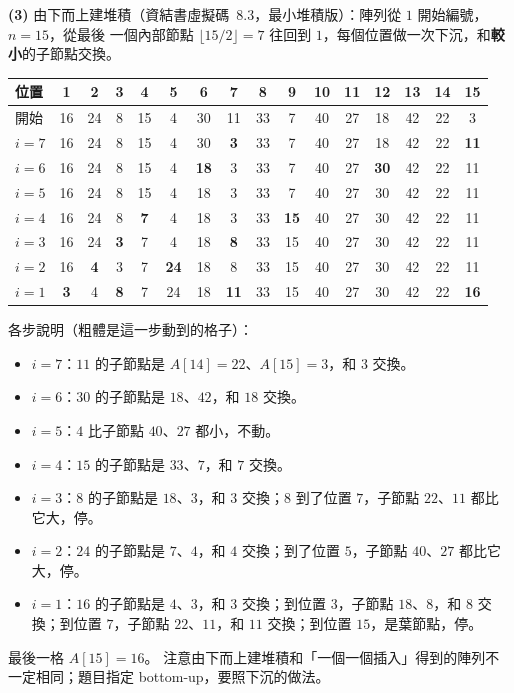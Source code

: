 \begin{pastsoln}
\textbf{(3)} 由下而上建堆積（資結書虛擬碼~8.3，最小堆積版）：陣列從 $1$ 開始編號，$n = 15$，從最後
一個內部節點 $\lfloor 15/2 \rfloor = 7$ 往回到 $1$，每個位置做一次下沉，和\textbf{較小}的子節點交換。
\begin{center}
\small
\setlength{\tabcolsep}{3.5pt}
\begin{tabular}{l*{15}{c}}
\toprule
位置 & 1 & 2 & 3 & 4 & 5 & 6 & 7 & 8 & 9 & 10 & 11 & 12 & 13 & 14 & 15 \\
\midrule
開始 & 16 & 24 & 8 & 15 & 4 & 30 & 11 & 33 & 7 & 40 & 27 & 18 & 42 & 22 & 3 \\
$i = 7$ & 16 & 24 & 8 & 15 & 4 & 30 & \textbf{3} & 33 & 7 & 40 & 27 & 18 & 42 & 22 & \textbf{11} \\
$i = 6$ & 16 & 24 & 8 & 15 & 4 & \textbf{18} & 3 & 33 & 7 & 40 & 27 & \textbf{30} & 42 & 22 & 11 \\
$i = 5$ & 16 & 24 & 8 & 15 & 4 & 18 & 3 & 33 & 7 & 40 & 27 & 30 & 42 & 22 & 11 \\
$i = 4$ & 16 & 24 & 8 & \textbf{7} & 4 & 18 & 3 & 33 & \textbf{15} & 40 & 27 & 30 & 42 & 22 & 11 \\
$i = 3$ & 16 & 24 & \textbf{3} & 7 & 4 & 18 & \textbf{8} & 33 & 15 & 40 & 27 & 30 & 42 & 22 & 11 \\
$i = 2$ & 16 & \textbf{4} & 3 & 7 & \textbf{24} & 18 & 8 & 33 & 15 & 40 & 27 & 30 & 42 & 22 & 11 \\
$i = 1$ & \textbf{3} & 4 & \textbf{8} & 7 & 24 & 18 & \textbf{11} & 33 & 15 & 40 & 27 & 30 & 42 & 22 & \textbf{16} \\
\bottomrule
\end{tabular}
\end{center}
各步說明（粗體是這一步動到的格子）：
\begin{itemize}
\item $i = 7$：$11$ 的子節點是 $A[14] = 22$、$A[15] = 3$，和 $3$ 交換。
\item $i = 6$：$30$ 的子節點是 $18$、$42$，和 $18$ 交換。
\item $i = 5$：$4$ 比子節點 $40$、$27$ 都小，不動。
\item $i = 4$：$15$ 的子節點是 $33$、$7$，和 $7$ 交換。
\item $i = 3$：$8$ 的子節點是 $18$、$3$，和 $3$ 交換；$8$ 到了位置 $7$，子節點 $22$、$11$ 都比它大，停。
\item $i = 2$：$24$ 的子節點是 $7$、$4$，和 $4$ 交換；到了位置 $5$，子節點 $40$、$27$ 都比它大，停。
\item $i = 1$：$16$ 的子節點是 $4$、$3$，和 $3$ 交換；到位置 $3$，子節點 $18$、$8$，和 $8$ 交換；到位置
$7$，子節點 $22$、$11$，和 $11$ 交換；到位置 $15$，是葉節點，停。
\end{itemize}
最後一格 $A[15] = 16$。 注意由下而上建堆積和「一個一個插入」得到的陣列不一定相同；題目指定
bottom-up，要照下沉的做法。


\end{pastsoln}
